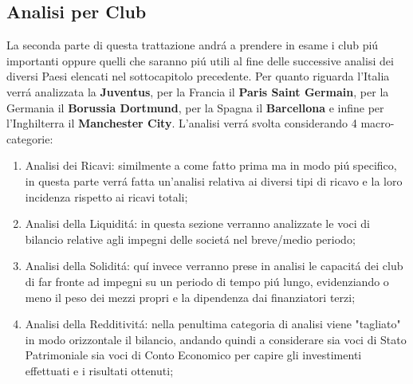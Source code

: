 \documentclass[
    corpo=12pt,
    oneside,
    evenboxes,
    tipotesi=triennale,
    stile=classica,
    oldstyle,
    autoretitolo,
    greek,
]{toptesi}
\begin{document}
\begin{interlinea}{1.5}
\section{Analisi per Club}
La seconda parte di questa trattazione andr\'a a prendere in esame i club pi\'u importanti oppure quelli che saranno pi\'u utili al fine 
delle successive analisi dei diversi Paesi elencati nel sottocapitolo precedente. Per quanto riguarda l'Italia verr\'a analizzata la \textbf{Juventus},
per la Francia il \textbf{Paris Saint Germain}, per la Germania il \textbf{Borussia Dortmund}, per la Spagna il \textbf{Barcellona} e infine per l'Inghilterra il 
\textbf{Manchester City}.\newline
L'analisi verr\'a svolta considerando 4 macro-categorie:
\begin{enumerate}
    \item Analisi dei Ricavi: similmente a come fatto prima ma in modo pi\'u specifico, in questa parte verr\'a fatta un'analisi relativa
        ai diversi tipi di ricavo e la loro incidenza rispetto ai ricavi totali; 
    \item Analisi della Liquidit\'a: in questa sezione verranno analizzate le voci di bilancio relative agli impegni delle societ\'a
        nel breve/medio periodo;
    \item Analisi della Solidit\'a: qu\'i invece verranno prese in analisi le capacit\'a dei club di far fronte ad impegni su un periodo di
        tempo pi\'u lungo, evidenziando o meno il peso dei mezzi propri e la dipendenza dai finanziatori terzi;
    \item Analisi della Redditivit\'a: nella penultima categoria di analisi viene "tagliato" in modo orizzontale il bilancio, andando quindi
        a considerare sia voci di Stato Patrimoniale sia voci di Conto Economico per capire gli investimenti effettuati e i risultati ottenuti;
\end{enumerate} 

\end{interlinea}
\end{document}

